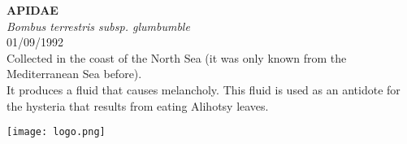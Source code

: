 \documentclass[
  landscape]{article}
\begin{document}
\begin{mdframed}[linecolor=mycolortext, linewidth=2pt, backgroundcolor=mycolor]

  \bigskip
  \begin{flushright}
  \begin{minipage}[t][-50ex][t]{16em}  
  \end{minipage}
  \end{flushright}
  \bigskip
  \begin{adjustwidth}{1cm}{1cm}
  {\fontsize{50pt}{0pt}\selectfont\bf\textcolor{mycolortext}{ APIDAE }} \\
  \linebreak
  \linebreak
  {\fontsize{40pt}{100pt}\selectfont\textcolor{mycolortext}{\emph{ Bombus terrestris subsp. glumbumble }}} \\
  \vfill
  {\fontsize{30pt}{100pt}\selectfont\textcolor{mycolortext}{ 01/09/1992 }} \\
  \vfill
  {\fontsize{30pt}{100pt}\selectfont\textcolor{mycolortext}{ Collected in the coast of the North Sea (it was only known from the Mediterranean Sea before). }} \\
  \vfill
  {\fontsize{30pt}{50pt}\selectfont\textcolor{mycolortext}{ It produces a fluid that causes melancholy. This fluid is used as an antidote for the hysteria that results from eating Alihotsy leaves. }} \\
  \end{adjustwidth}
  \begin{center}
  \texttt{[image: logo.png]}
  \end{center}
  \end{mdframed}
  \pagebreak

\end{document}
